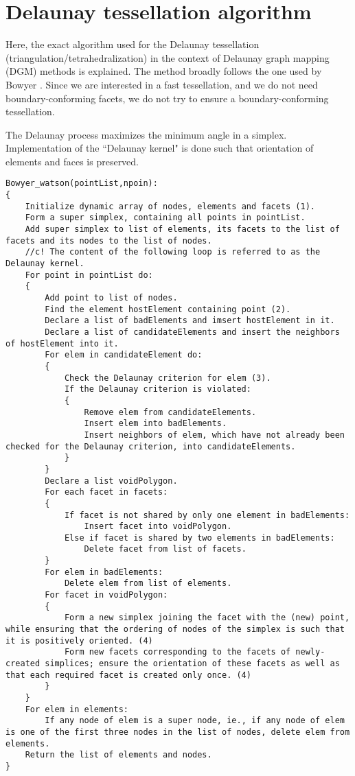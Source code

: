 \chapter{Delaunay tessellation algorithm}

Here, the exact algorithm used for the Delaunay tessellation (triangulation/tetrahedralization) in the context of Delaunay graph mapping (DGM) methods is explained. The method broadly follows the one used by Bowyer \cite{bowyer}. Since we are interested in a fast tessellation, and we do not need boundary-conforming facets, we do not try to ensure a boundary-conforming tessellation.

The Delaunay process maximizes the minimum angle in a simplex. Implementation of the ``Delaunay kernel" is done such that orientation of elements and faces is preserved.

\lstset{breaklines=true, tabsize=2}

\begin{lstlisting}
Bowyer_watson(pointList,npoin):
{
	Initialize dynamic array of nodes, elements and facets (1).
	Form a super simplex, containing all points in pointList.
	Add super simplex to list of elements, its facets to the list of facets and its nodes to the list of nodes.
	//c! The content of the following loop is referred to as the Delaunay kernel.
	For point in pointList do:
	{
		Add point to list of nodes.
		Find the element hostElement containing point (2).
		Declare a list of badElements and imsert hostElement in it.
		Declare a list of candidateElements and insert the neighbors of hostElement into it.
		For elem in candidateElement do:
		{
			Check the Delaunay criterion for elem (3).
			If the Delaunay criterion is violated:
			{
				Remove elem from candidateElements.
				Insert elem into badElements.
				Insert neighbors of elem, which have not already been checked for the Delaunay criterion, into candidateElements.
			}
		}
		Declare a list voidPolygon.
		For each facet in facets:
		{
			If facet is not shared by only one element in badElements:
				Insert facet into voidPolygon.
			Else if facet is shared by two elements in badElements:
				Delete facet from list of facets.
		}
		For elem in badElements:
			Delete elem from list of elements.
		For facet in voidPolygon:
		{
			Form a new simplex joining the facet with the (new) point, while ensuring that the ordering of nodes of the simplex is such that it is positively oriented. (4)
			Form new facets corresponding to the facets of newly-created simplices; ensure the orientation of these facets as well as that each required facet is created only once. (4)
		}
	}
	For elem in elements:
		If any node of elem is a super node, ie., if any node of elem is one of the first three nodes in the list of nodes, delete elem from elements.
	Return the list of elements and nodes.
}
\end{lstlisting}

